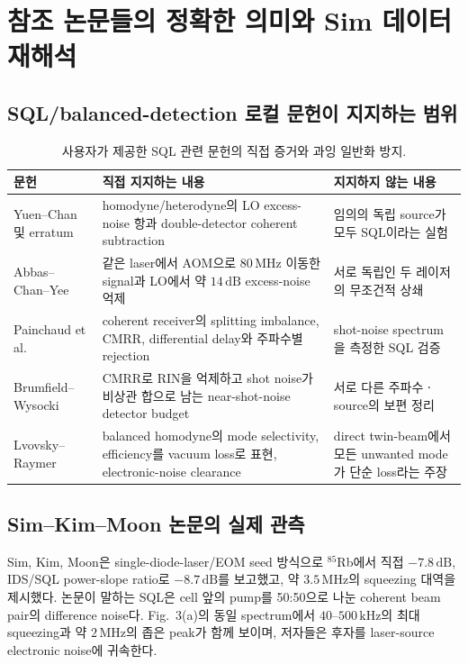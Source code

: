 \documentclass[11pt,a4paper]{article}
\newcommand{\MHz}{\,\mathrm{MHz}}
\newcommand{\kHz}{\,\mathrm{kHz}}
\newcommand{\dB}{\,\mathrm{dB}}
\begin{document}
\section{참조 논문들의 정확한 의미와 Sim 데이터 재해석}

\subsection{SQL/balanced-detection 로컬 문헌이 지지하는 범위}

\begin{table}[H]
\centering
\caption{사용자가 제공한 SQL 관련 문헌의 직접 증거와 과잉 일반화 방지.}
\label{tab:sql-literature}
\small
\begin{tabularx}{\textwidth}{L{3.0cm}Y Y}
\toprule
문헌 & 직접 지지하는 내용 & 지지하지 않는 내용\\
\midrule
Yuen--Chan 및 erratum\cite{YuenChan1983,YuenChan1983Erratum} & homodyne/heterodyne의 LO excess-noise 항과
double-detector coherent subtraction & 임의의 독립 source가 모두 SQL이라는 실험\\
Abbas--Chan--Yee\cite{Abbas1983} & 같은 laser에서 AOM으로 $80\MHz$ 이동한 signal과
LO에서 약 $14\dB$ excess-noise 억제 & 서로 독립인 두 레이저의 무조건적 상쇄\\
Painchaud et al.\cite{Painchaud2009} & coherent receiver의 splitting imbalance,
CMRR, differential delay와 주파수별 rejection & shot-noise spectrum을 측정한 SQL 검증\\
Brumfield--Wysocki\cite{Brumfield2012} & CMRR로 RIN을 억제하고 shot noise가 비상관
합으로 남는 near-shot-noise detector budget & 서로 다른 주파수ㆍsource의 보편 정리\\
Lvovsky--Raymer\cite{LvovskyRaymer2009} & balanced homodyne의 mode selectivity,
efficiency를 vacuum loss로 표현, electronic-noise clearance & direct twin-beam에서
모든 unwanted mode가 단순 loss라는 주장\\
\bottomrule
\end{tabularx}
\end{table}

\subsection{Sim--Kim--Moon 논문의 실제 관측}

Sim, Kim, Moon은 single-diode-laser/EOM seed 방식으로 $^{85}$Rb에서 직접
$-7.8\dB$, IDS/SQL power-slope ratio로 $-8.7\dB$를 보고했고, 약
$3.5\MHz$의 squeezing 대역을 제시했다\cite{Sim2025}. 논문이 말하는 SQL은 cell 앞의
pump를 50:50으로 나눈 coherent beam pair의 difference noise다. Fig.~3(a)의 동일
spectrum에서 $40$--$500\kHz$의 최대 squeezing과 약 $2\MHz$의 좁은 peak가 함께
보이며, 저자들은 후자를 laser-source electronic noise에 귀속한다.
\end{document}
